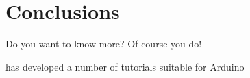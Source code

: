 \newpage
\chapter*{Conclusions}


Do you want to know more? Of course you do!


\citet{fried-12} has developed a number of tutorials suitable for \gls{Arduino}


